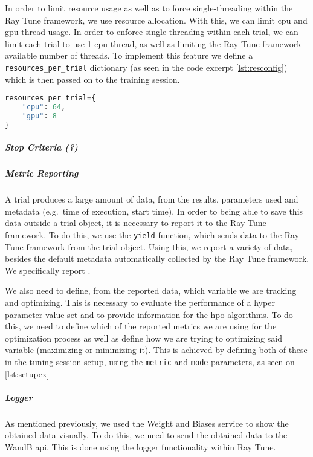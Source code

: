 In order to limit resource usage as well as to force single-threading within the Ray Tune framework, we use resource allocation. With this, we can limit \acrshort{cpu} and \acrshort{gpu} thread usage. In order to enforce single-threading within each trial, we can limit each trial to use 1 \acrshort{cpu} thread, as well as limiting the Ray Tune framework available number of threads. To implement this feature we define a \verb!resources_per_trial! dictionary (as seen in the code excerpt \ref{lst:resconfig}) which is then passed on to the training session.


\begin{lstlisting}[language=Python, caption=Example resource allocation configuration, captionpos=b, label={lst:resconfig}]
resources_per_trial={
    "cpu": 64, 
    "gpu": 8
}
\end{lstlisting}

\subparagraph{Stop Criteria (?)}



\subparagraph{Metric Reporting}

A trial produces a large amount of data, from the results, parameters used and metadata (e.g.\ time of execution, start time). In order to being able to save this data outside a trial object, it is necessary to report it to the Ray Tune framework. To do this, we use the \verb!yield! function, which sends data to the Ray Tune framework from the trial object. Using this, we report a variety of data, besides the default metadata automatically collected by the Ray Tune framework. We specifically report .

We also need to define, from the reported data, which variable we are tracking and optimizing. This is necessary to evaluate the performance of a hyper parameter value set and to provide information for the \acrshort{hpo} algorithms. To do this, we need to define which of the reported metrics we are using for the optimization process as well as define how we are trying to optimizing said variable (maximizing or minimizing it). This is achieved by defining both of these in the tuning session setup, using the \verb!metric! and \verb!mode! parameters, as seen on \ref{lst:setupex}

\subparagraph{Logger}

As mentioned previously, we used the Weight and Biases service to show the obtained data visually. To do this, we need to send the obtained data to the WandB \acrshort{api}. This is done using the logger functionality within Ray Tune. 
